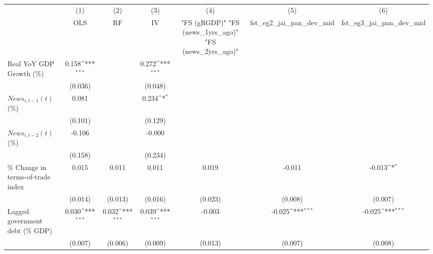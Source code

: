 {
\def\sym#1{\ifmmode^{#1}\else\(^{#1}\)\fi}
\begin{tabular}{l*{6}{c}}
\toprule
                    &\multicolumn{1}{c}{(1)}&\multicolumn{1}{c}{(2)}&\multicolumn{1}{c}{(3)}&\multicolumn{1}{c}{(4)}&\multicolumn{1}{c}{(5)}&\multicolumn{1}{c}{(6)}\\
                    &\multicolumn{1}{c}{OLS}&\multicolumn{1}{c}{RF}&\multicolumn{1}{c}{IV}&\multicolumn{1}{c}{ "FS (gRGDP)"  "FS (news_1yrs_ago)"  "FS (news_2yrs_ago)" }&\multicolumn{1}{c}{fst_eg2_jai_pan_dev_mid}&\multicolumn{1}{c}{fst_eg3_jai_pan_dev_mid}\\
\midrule
Real YoY GDP Growth (\%)&       0.158\sym{***}&                     &       0.272\sym{***}&                     &                     &                     \\
                    &     (0.036)         &                     &     (0.048)         &                     &                     &                     \\
\addlinespace
$ News_{i,t-1}(t)$ (\%)&       0.081         &                     &       0.234\sym{*}  &                     &                     &                     \\
                    &     (0.101)         &                     &     (0.129)         &                     &                     &                     \\
\addlinespace
$ News_{i,t-2}(t)$ (\%)&      -0.106         &                     &      -0.000         &                     &                     &                     \\
                    &     (0.158)         &                     &     (0.234)         &                     &                     &                     \\
\addlinespace
\% Change in terms-of-trade index&       0.015         &       0.011         &       0.011         &       0.019         &      -0.011         &      -0.013\sym{*}  \\
                    &     (0.014)         &     (0.013)         &     (0.016)         &     (0.023)         &     (0.008)         &     (0.007)         \\
\addlinespace
Lagged government debt (\% GDP)&       0.030\sym{***}&       0.032\sym{***}&       0.039\sym{***}&      -0.003         &      -0.025\sym{***}&      -0.025\sym{***}\\
                    &     (0.007)         &     (0.006)         &     (0.009)         &     (0.013)         &     (0.007)         &     (0.008)         \\

\end{tabular}}
